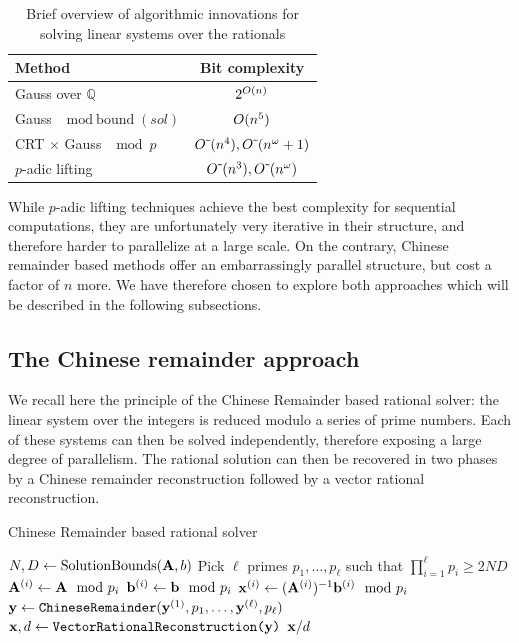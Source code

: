 \begin{table}[htb]
\begin{tabular}{lc}
  \toprule
  Method  & Bit complexity \\
  \midrule
  Gauss over $\mathbb{Q}$ & $2^{O(n)}$ \\
  Gauss $\mod \text{bound}(sol)$ & $O(n^5)$\\
  CRT $\times$ Gauss $\mod p$ & $O\tilde\ (n^4), O\tilde\ (n^\omega+1)$\\
  $p$-adic lifting & $O\tilde\ (n^3), O\tilde\ (n^\omega)$\\
  \bottomrule
\end{tabular}
\caption{Brief overview of algorithmic innovations for solving linear systems over the rationals}\label{tab:complexities}
\end{table}

While $p$-adic lifting techniques achieve the best complexity for sequential computations, they are unfortunately very
iterative in their structure, and therefore harder to parallelize at a large scale. On the contrary, Chinese remainder
based methods offer an embarrassingly parallel structure, but cost a factor of $n$ more. We have therefore chosen to
explore both approaches which will be described in the following subsections.
\subsection{The Chinese remainder approach}

We recall here the principle of the Chinese Remainder based rational solver:
the linear system over the integers is reduced modulo a series of prime numbers. Each of these systems can then be solved
independently, therefore exposing a large degree of parallelism. The rational solution can then be recovered in two
phases by a Chinese remainder reconstruction followed by a vector rational reconstruction.

\begin{algorithm}[htb]
  \caption{Chinese Remainder based rational solver}
  \begin{algorithmic}[1]
    \State $N,D \leftarrow \text{SolutionBounds}(\mathbf{A},b)$
    \State Pick $\ell$ primes $p_1,\dots, p_\ell$ such that $\prod_{i=1}^\ell p_i \geq 2ND$
    \State $\mathbf{A}^{(i)} \leftarrow \mathbf{A}\mod p_i$
    \State $\mathbf{b}^{(i)} \leftarrow \mathbf{b}\mod p_i$
    \State $\mathbf{x}^{(i)} \leftarrow (\mathbf{A}^{(i)})^{-1} \mathbf{b}^{(i)} \mod p_i$
    \EndFor
  \State $\mathbf{y} \leftarrow \texttt{ChineseRemainder}(\mathbf{y}^{(1)},p_1,\dots, \mathbf{y}^{(\ell)},p_\ell)$
  \State $\mathbf{x},d\leftarrow \texttt{VectorRationalReconstruction(\ensuremath{\mathbf{y}})}$
  \State \Return $\mathbf{x}/d$
\end{algorithmic}
\end{algorithm}

